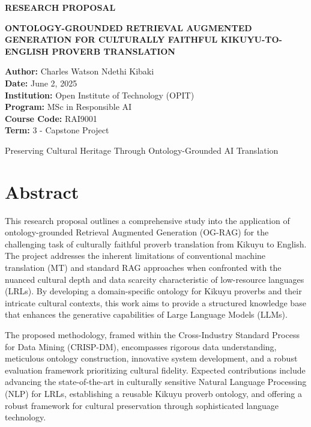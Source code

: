 \documentclass[12pt]{article}
\begin{document}
\begin{titlepage}
\centering
{\Large\bfseries RESEARCH PROPOSAL \par}
\vspace{0.5cm}
{\huge\bfseries ONTOLOGY-GROUNDED RETRIEVAL AUGMENTED GENERATION FOR CULTURALLY FAITHFUL KIKUYU-TO-ENGLISH PROVERB TRANSLATION \par}
\vfill

{\large
\textbf{Author:} Charles Watson Ndethi Kibaki \\[0.5cm]
\textbf{Date:} June 2, 2025 \\[0.5cm]
\textbf{Institution:} Open Institute of Technology (OPIT) \\[0.3cm]
\textbf{Program:} MSc in Responsible AI \\[0.3cm]
\textbf{Course Code:} RAI9001 \\[0.3cm]
\textbf{Term:} 3 - Capstone Project \\[1cm]
}

{\large Preserving Cultural Heritage Through Ontology-Grounded AI Translation \par}
\vfill
\end{titlepage}

\tableofcontents
\newpage

\section*{Abstract}

This research proposal outlines a comprehensive study into the application of ontology-grounded Retrieval Augmented Generation (OG-RAG) for the challenging task of culturally faithful proverb translation from Kikuyu to English. The project addresses the inherent limitations of conventional machine translation (MT) and standard RAG approaches when confronted with the nuanced cultural depth and data scarcity characteristic of low-resource languages (LRLs). By developing a domain-specific ontology for Kikuyu proverbs and their intricate cultural contexts, this work aims to provide a structured knowledge base that enhances the generative capabilities of Large Language Models (LLMs). 

The proposed methodology, framed within the Cross-Industry Standard Process for Data Mining (CRISP-DM), encompasses rigorous data understanding, meticulous ontology construction, innovative system development, and a robust evaluation framework prioritizing cultural fidelity. Expected contributions include advancing the state-of-the-art in culturally sensitive Natural Language Processing (NLP) for LRLs, establishing a reusable Kikuyu proverb ontology, and offering a robust framework for cultural preservation through sophisticated language technology.
\end{document}
